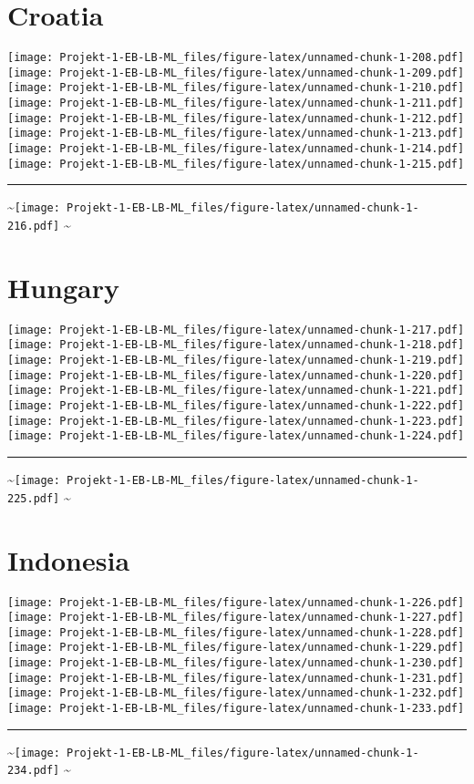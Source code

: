 \documentclass[]{article}
\begin{document}
\section{Croatia}\label{croatia}

\texttt{[image: Projekt-1-EB-LB-ML\_files/figure-latex/unnamed-chunk-1-208.pdf]}
\texttt{[image: Projekt-1-EB-LB-ML\_files/figure-latex/unnamed-chunk-1-209.pdf]}
\texttt{[image: Projekt-1-EB-LB-ML\_files/figure-latex/unnamed-chunk-1-210.pdf]}
\texttt{[image: Projekt-1-EB-LB-ML\_files/figure-latex/unnamed-chunk-1-211.pdf]}
\texttt{[image: Projekt-1-EB-LB-ML\_files/figure-latex/unnamed-chunk-1-212.pdf]}
\texttt{[image: Projekt-1-EB-LB-ML\_files/figure-latex/unnamed-chunk-1-213.pdf]}
\texttt{[image: Projekt-1-EB-LB-ML\_files/figure-latex/unnamed-chunk-1-214.pdf]}
\texttt{[image: Projekt-1-EB-LB-ML\_files/figure-latex/unnamed-chunk-1-215.pdf]}
\bigskip\hrule\bigskip
\textasciitilde{}\hfill\texttt{[image: Projekt-1-EB-LB-ML\_files/figure-latex/unnamed-chunk-1-216.pdf]}
\hfill \textasciitilde{} \vfill\eject

\section{Hungary}\label{hungary}

\texttt{[image: Projekt-1-EB-LB-ML\_files/figure-latex/unnamed-chunk-1-217.pdf]}
\texttt{[image: Projekt-1-EB-LB-ML\_files/figure-latex/unnamed-chunk-1-218.pdf]}
\texttt{[image: Projekt-1-EB-LB-ML\_files/figure-latex/unnamed-chunk-1-219.pdf]}
\texttt{[image: Projekt-1-EB-LB-ML\_files/figure-latex/unnamed-chunk-1-220.pdf]}
\texttt{[image: Projekt-1-EB-LB-ML\_files/figure-latex/unnamed-chunk-1-221.pdf]}
\texttt{[image: Projekt-1-EB-LB-ML\_files/figure-latex/unnamed-chunk-1-222.pdf]}
\texttt{[image: Projekt-1-EB-LB-ML\_files/figure-latex/unnamed-chunk-1-223.pdf]}
\texttt{[image: Projekt-1-EB-LB-ML\_files/figure-latex/unnamed-chunk-1-224.pdf]}
\bigskip\hrule\bigskip
\textasciitilde{}\hfill\texttt{[image: Projekt-1-EB-LB-ML\_files/figure-latex/unnamed-chunk-1-225.pdf]}
\hfill \textasciitilde{} \vfill\eject

\section{Indonesia}\label{indonesia}

\texttt{[image: Projekt-1-EB-LB-ML\_files/figure-latex/unnamed-chunk-1-226.pdf]}
\texttt{[image: Projekt-1-EB-LB-ML\_files/figure-latex/unnamed-chunk-1-227.pdf]}
\texttt{[image: Projekt-1-EB-LB-ML\_files/figure-latex/unnamed-chunk-1-228.pdf]}
\texttt{[image: Projekt-1-EB-LB-ML\_files/figure-latex/unnamed-chunk-1-229.pdf]}
\texttt{[image: Projekt-1-EB-LB-ML\_files/figure-latex/unnamed-chunk-1-230.pdf]}
\texttt{[image: Projekt-1-EB-LB-ML\_files/figure-latex/unnamed-chunk-1-231.pdf]}
\texttt{[image: Projekt-1-EB-LB-ML\_files/figure-latex/unnamed-chunk-1-232.pdf]}
\texttt{[image: Projekt-1-EB-LB-ML\_files/figure-latex/unnamed-chunk-1-233.pdf]}
\bigskip\hrule\bigskip
\textasciitilde{}\hfill\texttt{[image: Projekt-1-EB-LB-ML\_files/figure-latex/unnamed-chunk-1-234.pdf]}
\hfill \textasciitilde{} \vfill\eject
\end{document}
